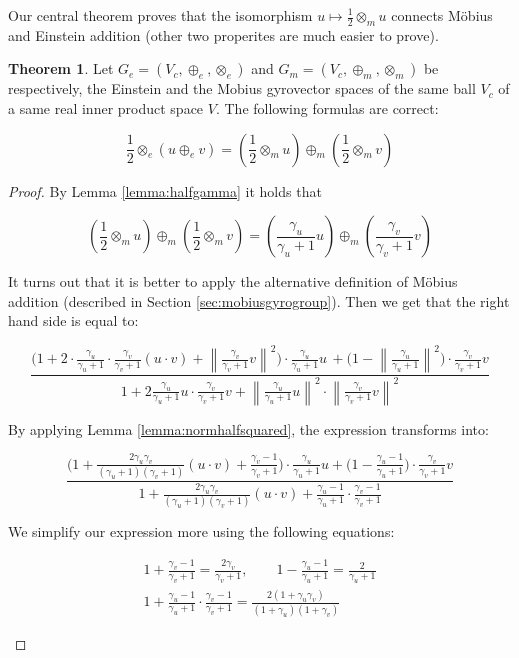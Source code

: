 \documentclass[a4paper]{article}
\theoremstyle{definition}
\newtheorem{theorem}{Theorem}[section]
\newcommand{\norm}[1]{\left\lVert#1\right\rVert}
\begin{document}
Our central theorem proves that the isomorphism
$u \mapsto \frac{1}{2}\otimes_m u$ connects M\"obius and Einstein
addition (other two properites are much easier to prove).

\begin{theorem}
  Let $G_e=(V_c, \oplus_e, \otimes_e)$ and
  $G_m=(V_c, \oplus_m, \otimes_m)$ be respectively, the Einstein and
  the Mobius gyrovector spaces of the same ball $V_c$ of a same real
  inner product space $V$.  The following formulas are correct:
  
  $$\frac{1}{2}\otimes_e (u\oplus_e v) = (\frac{1}{2}\otimes_m u) \oplus_m (\frac{1}{2} \otimes_m v)$$
\end{theorem}
\begin{proof}
  By Lemma \ref{lemma:halfgamma} it holds that

  $$(\frac{1}{2}\otimes_m u) \oplus_m (\frac{1}{2} \otimes_m v) = (\frac{\gamma_u}{\gamma_u + 1} u) \oplus_m (\frac{\gamma_v}{\gamma_v + 1} v)$$

  It turns out that it is better to apply the alternative definition
  of M\"obius addition (described in Section
  \ref{sec:mobiusgyrogroup}). Then we get that the right hand side is
  equal to:

$$
  \frac{\Big(1 + 2\cdot\frac{\gamma_u}{\gamma_u+1}\cdot\frac{\gamma_v}{\gamma_v+1}(u\cdot v) + \norm{\frac{\gamma_v}{\gamma_v+1}v}^2\Big) \cdot \frac{\gamma_u}{\gamma_u + 1} u\, + \Big(1-\norm{\frac{\gamma_u}{\gamma_u+1}}^2\Big)\cdot \frac{\gamma_v}{\gamma_v+1}v}
  {1+2\frac{\gamma_u}{\gamma_u+1}u \cdot \frac{\gamma_v}{\gamma_v+1}v + \norm{\frac{\gamma_u}{\gamma_u+1}u}^2 \cdot \norm{\frac{\gamma_v}{\gamma_v+1}v}^2}
$$

By applying Lemma \ref{lemma:normhalfsquared}, the expression
transforms into:

$$\frac
{\Big(1+\frac{2\gamma_u\gamma_v}{(\gamma_u+1)(\gamma_v+1)}(u\cdot v) + \frac{\gamma_v -1}{\gamma_v+1}\Big)\cdot \frac{\gamma_u}{\gamma_u+1}u + \Big(1-\frac{\gamma_u-1}{\gamma_u+1}\Big)\cdot \frac{\gamma_v}{\gamma_v+1}v}
{1 + \frac{2\gamma_u\gamma_v}{(\gamma_u+1)(\gamma_v+1)}(u\cdot v)+\frac{\gamma_u-1}{\gamma_u+1}\cdot\frac{\gamma_v-1}{\gamma_v+1}}$$

We simplify our expression more using the following equations:

\begin{footnotesize}
\begin{eqnarray*}
  1+\frac{\gamma_v-1}{\gamma_v+1}=\frac{2\gamma_v}{\gamma_v+1}, \qquad 1-\frac{\gamma_u-1}{\gamma_u+1}=\frac{2}{\gamma_u+1}\\
  1+\frac{\gamma_u-1}{\gamma_u+1}\cdot \frac{\gamma_v-1}{\gamma_v+1}= \frac{2(1+\gamma_u\gamma_v)}{(1+\gamma_u)(1+\gamma_v)}
\end{eqnarray*}
\end{footnotesize}


\end{proof}
\end{document}
